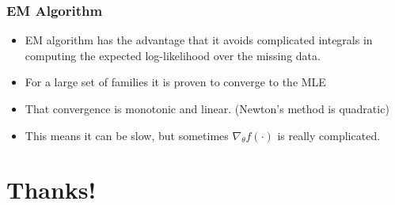 \documentclass[aspectratio=169]{beamer}
\begin{document}
\begin{frame}
\frametitle{EM Algorithm}
\begin{itemize}
\item EM algorithm has the advantage that it avoids complicated integrals in computing the expected log-likelihood over the missing data.
\item For a large set of families it is proven to converge to the MLE
\item That convergence is \alert{monotonic} and \alert{linear}. (Newton's method is quadratic)
\item This means it can be slow, but sometimes $\nabla_{\theta} f (\cdot)$ is really complicated.
\end{itemize}
\end{frame}

\section*{Thanks!}
\end{document}
